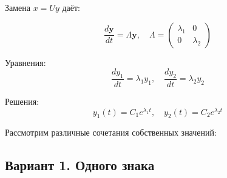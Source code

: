 	Замена $x = U y$ даёт:
	
	\begin{equation}
		\frac{d \mathbf{y}}{d t} = \Lambda \mathbf{y}, \quad \Lambda = \begin{pmatrix} \lambda_1 & 0 \\ 0 & \lambda_2 \end{pmatrix}
	\end{equation}
	
	Уравнения:
	\begin{equation}
		\frac{d y_1}{d t} = \lambda_1 y_1, \quad \frac{d y_2}{d t} = \lambda_2 y_2
	\end{equation}
	
	Решения:
	\begin{equation}
		y_1(t) = C_1 e^{\lambda_1 t}, \quad y_2(t) = C_2 e^{\lambda_2 t}
	\end{equation}
	
	\newpage
	Рассмотрим различные сочетания собственных значений:
	
	\begin{pinkbox}
		\subsection*{Вариант 1. Одного знака}
	\end{pinkbox}
	

